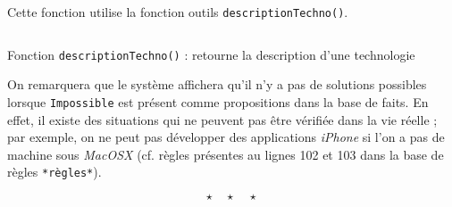 \documentclass[a4paper,12pt]{article}
\begin{document}
Cette fonction utilise la fonction outils \texttt{descriptionTechno()}.


\begin{listing}[H]
	\centering
	\inputminted[breaklines=true,linenos,firstline=12]{lisp}{../afficherPropositions.lisp}
	\caption{Fonction \texttt{descriptionTechno()} : retourne la description d'une technologie}
\end{listing}


On remarquera que le système affichera qu'il n'y a pas de solutions possibles lorsque \texttt{Impossible} est présent comme propositions dans la base de faits. En effet, il existe des situations qui ne peuvent pas être vérifiée dans la vie réelle ; par exemple, on ne peut pas développer des applications \textit{iPhone} si l'on a pas de machine sous \textit{MacOSX} (cf. règles présentes au lignes 102 et 103 dans la base de règles \texttt{*règles*}).

\[ \star \quad \star \quad \star \]
\newpage

\end{document}
